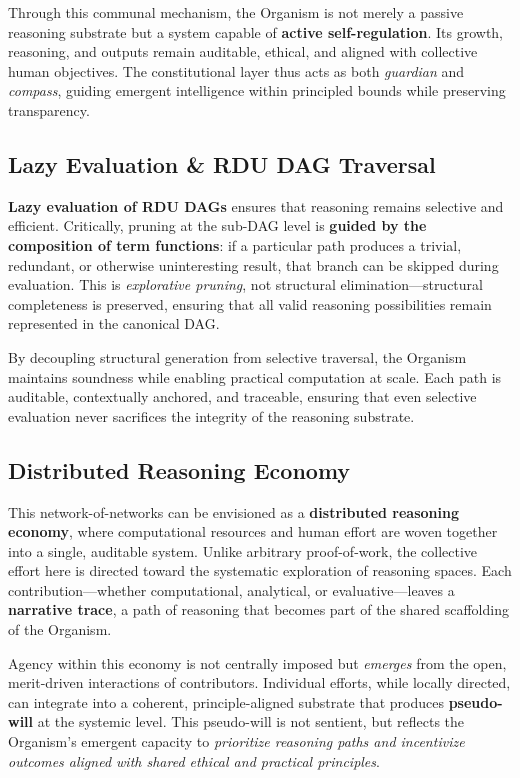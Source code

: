 \documentclass[12pt]{article}
\begin{document}
Through this communal mechanism, the Organism is not merely a passive reasoning substrate but a system capable of \textbf{active self-regulation}. Its growth, reasoning, and outputs remain auditable, ethical, and aligned with collective human objectives. The constitutional layer thus acts as both \textit{guardian} and \textit{compass}, guiding emergent intelligence within principled bounds while preserving transparency.  

\subsection{Lazy Evaluation \& RDU DAG Traversal}

\textbf{Lazy evaluation of RDU DAGs} ensures that reasoning remains selective and efficient. Critically, pruning at the sub-DAG level is \textbf{guided by the composition of term functions}: if a particular path produces a trivial, redundant, or otherwise uninteresting result, that branch can be skipped during evaluation. This is \textit{explorative pruning}, not structural elimination—structural completeness is preserved, ensuring that all valid reasoning possibilities remain represented in the canonical DAG.

By decoupling structural generation from selective traversal, the Organism maintains soundness while enabling practical computation at scale. Each path is auditable, contextually anchored, and traceable, ensuring that even selective evaluation never sacrifices the integrity of the reasoning substrate.

\subsection{Distributed Reasoning Economy}

This network-of-networks can be envisioned as a \textbf{distributed reasoning economy}, where computational resources and human effort are woven together into a single, auditable system. Unlike arbitrary proof-of-work, the collective effort here is directed toward the systematic exploration of reasoning spaces. Each contribution—whether computational, analytical, or evaluative—leaves a \textbf{narrative trace}, a path of reasoning that becomes part of the shared scaffolding of the Organism.  

Agency within this economy is not centrally imposed but \textit{emerges} from the open, merit-driven interactions of contributors. Individual efforts, while locally directed, can integrate into a coherent, principle-aligned substrate that produces \textbf{pseudo-will} at the systemic level. This pseudo-will is not sentient, but reflects the Organism’s emergent capacity to \textit{prioritize reasoning paths and incentivize outcomes aligned with shared ethical and practical principles}.  
\end{document}
